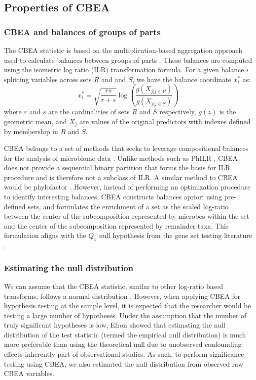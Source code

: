 \documentclass[10pt,letterpaper]{article}
\begin{document}
\subsection*{Properties of CBEA}
\subsubsection*{CBEA and balances of groups of parts}
The CBEA statistic is based on the multiplication-based aggregation approach used to calculate balances between groups of parts \cite{egozcue2005}. These balances are computed using the isometric log ratio (ILR) transformation \cite{egozcue2003} formula. For a given balance $i$ splitting variables across sets $R$ and and $S$, we have the balance coordinate $x^{*}_{i}$ as: 
\begin{equation}\label{ilr_standard}
    x^{*}_i = \sqrt{\frac{rs}{r+s}} \log\left(\frac{g(X_{j|j \in R})}{g(X_{j|j \in S})}\right)
\end{equation}
where $r$ and $s$ are the cardinalities of sets $R$ and $S$ respectively, $g(z)$ is the geometric mean, and $X_{j}$ are values of the original predictors with indexes defined by membership in $R$ and $S$. 

CBEA belongs to a set of methods that seeks to leverage compositional balances for the analysis of microbiome data \cite{washburne2017, rivera-pinto2018, silverman2017, morton2017}. Unlike methods such as PhILR \cite{silverman2017}, CBEA does not provide a sequential binary partition that forms the basis for ILR procedure \cite{egozcue2003} and is therefore not a subclass of ILR. A similar method to CBEA would be phylofactor \cite{washburne2017}. However, instead of performing an optimization procedure to identify interesting balances, CBEA constructs balances apriori using pre-defined sets, and formulates the enrichment of a set as the scaled log-ratio between the center of the subcomposition represented by microbes within the set and the center of the subcomposition represented by remainder taxa. This formulation aligns with the $Q_1$ null hypothesis from the gene set testing literature \cite{tian2005}. 

\subsubsection*{Estimating the null distribution}
We can assume that the CBEA statistic, similar to other log-ratio based transforms, follows a normal distribution \cite{egozcue2003, aitchison1980}. However, when applying CBEA for hypothesis testing at the sample level, it is expected that the researcher would be testing a large number of hypotheses. Under the assumption that the number of truly significant hypotheses is low, Efron \cite{efron2004} showed that estimating the null distribution of the test statistic (termed the empirical null distribution) is much more preferable than using the theoretical null due to unobserved confounding effects inherently part of observational studies. As such, to perform significance testing using CBEA, we also estimated the null distribution from observed raw CBEA variables. 
\end{document}
